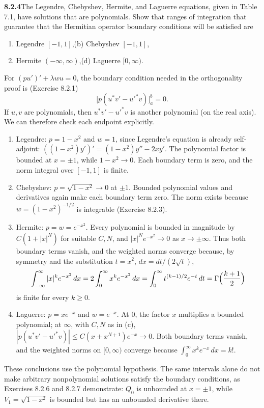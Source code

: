 \par\bigskip
\noindent\textbf{8.2.4}\quad The Legendre, Chebyshev, Hermite, and Laguerre
equations, given in Table 7.1, have solutions that are polynomials. Show that
ranges of integration that guarantee that the Hermitian operator boundary
conditions will be satisfied are
\begin{enumerate}
\item[(a)] Legendre $[-1,1]$,\quad(b) Chebyshev $[-1,1]$,
\item[(c)] Hermite $(-\infty,\infty)$,\quad(d) Laguerre $[0,\infty)$.
\end{enumerate}
\solution
For $(pu')'+\lambda wu=0$, the boundary condition needed in the
orthogonality proof is (Exercise 8.2.1)
\[
\bigl[p(u^*v'-u'^*v)\bigr]_a^b=0.
\]
If $u,v$ are polynomials, then $u^*v'-u'^*v$ is another polynomial
(on the real axis).  We can therefore check each endpoint explicitly.
\begin{enumerate}
\item[(a)] Legendre: $p=1-x^2$ and $w=1$, since Legendre's equation
is already self-adjoint: $((1-x^2)y')'=(1-x^2)y''-2xy'$.
The polynomial factor is bounded at $x=\pm1$, while
$1-x^2\to0$.  Each boundary term is zero, and the norm integral over
$[-1,1]$ is finite.
\item[(b)] Chebyshev: $p=\sqrt{1-x^2}\to0$ at $\pm1$.
Bounded polynomial values and derivatives again make each boundary
term zero.  The norm exists because $w=(1-x^2)^{-1/2}$ is integrable
(Exercise 8.2.3).
\item[(c)] Hermite: $p=w=e^{-x^2}$.  Every polynomial is bounded in
magnitude by $C(1+|x|^N)$ for suitable $C,N$, and
$|x|^Ne^{-x^2}\to0$ as $x\to\pm\infty$.
Thus both boundary terms vanish, and the weighted norms converge
because, by symmetry and the substitution $t=x^2$, $dx=dt/(2\sqrt t)$,
\[
\int_{-\infty}^{\infty}|x|^ke^{-x^2}\,dx
=2\int_0^\infty x^ke^{-x^2}\,dx
=\int_0^\infty t^{(k-1)/2}e^{-t}\,dt
=\Gamma\Bigl(\frac{k+1}2\Bigr)
\]
is finite for every $k\ge0$.
\item[(d)] Laguerre: $p=xe^{-x}$ and $w=e^{-x}$.
At $0$, the factor $x$ multiplies a bounded polynomial; at $\infty$,
with $C,N$ as in (c),
$|p(u^*v'-u'^*v)|\le C(x+x^{N+1})e^{-x}\to0$.  Both boundary terms
vanish, and the weighted norms on $[0,\infty)$ converge because
$\int_0^\infty x^ke^{-x}\,dx=k!$.
\end{enumerate}
These conclusions use the polynomial hypothesis.  The same intervals
alone do not make arbitrary nonpolynomial solutions satisfy the
boundary conditions, as Exercises 8.2.6 and 8.2.7 demonstrate:
$Q_0$ is unbounded at $x=\pm1$, while $V_1=\sqrt{1-x^2}$ is bounded
but has an unbounded derivative there.


